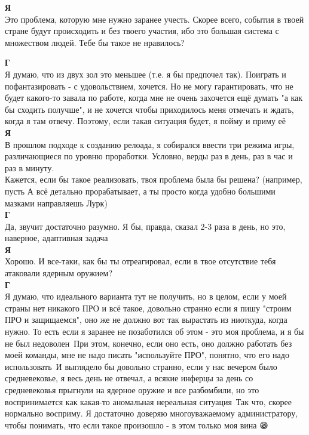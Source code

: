 \textbf{Я}\\
Это проблема, которую мне нужно заранее учесть. Скорее всего, события в твоей стране будут происходить и без твоего участия, ибо это большая система с множеством людей. Тебе бы такое не нравилось?

\textbf{Г}\\
Я думаю, что из двух зол это меньшее (т.е. я бы предпочел так). Поиграть и пофантазировать - с удовольствием, хочется. Но не могу гарантировать, что не будет какого-то завала по работе, когда мне не очень захочется ещё думать "а как бы сходить получше", и не хочется чтобы приходилось меня отмечать и ждать, когда я там отвечу. Поэтому, если такая ситуация будет, я пойму и приму её\\

\textbf{Я}\\
В прошлом подходе к созданию релоада, я собирался ввести три режима игры, различающиеся по уровню проработки. Условно, верды раз в день, раз в час и раз в минуту.\\
Кажется, если бы такое реализовать, твоя проблема была бы решена? (например, пусть А всё детально прорабатывает, а ты просто когда удобно большими мазками направляешь Лурк)\\

\textbf{Г}\\
Да, звучит достаточно разумно. Я бы, правда, сказал 2-3 раза в день, но это, наверное, адаптивная задача\\

\textbf{Я}\\
Хорошо. И все-таки, как бы ты отреагировал, если в твое отсутствие тебя атаковали ядерным оружием?\\

\textbf{Г}\\
Я думаю, что идеального варианта тут не получить, но в целом, если у моей страны нет никакого ПРО и всё такое, довольно странно если я пишу "строим ПРО и защищаемся", оно же не должно вот так вырастать из ниоткуда, когда нужно. То есть если я заранее не позаботился об этом - это моя проблема, и я бы не был недоволен\
При этом, конечно, если оно есть, оно должно работать без моей команды, мне не надо писать "используйте ПРО", понятно, что его надо использовать\
И выглядело бы довольно странно, если у нас вечером было средневековье, я весь день не отвечал, а всякие инферцы за день со средневековья прыгнули на ядерное оружие и все разбомбили, но это воспринимается как какая-то аномальная нереальная ситуация\
Так что, скорее нормально восприму. Я достаточно доверяю многоуважаемому администратору, чтобы понимать, что если такое произошло - в этом только моя вина 😁🙏

